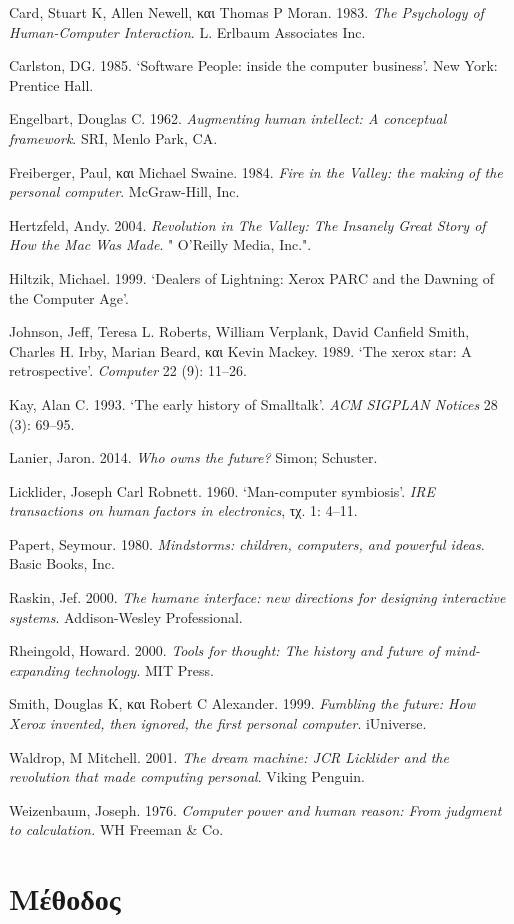 \documentclass[
]{article}
\begin{document}
Card, Stuart K, Allen Newell, και Thomas P Moran. 1983. \emph{The
Psychology of Human-Computer Interaction}. L. Erlbaum Associates Inc.

Carlston, DG. 1985. {`Software People: inside the computer business'}.
New York: Prentice Hall.

Engelbart, Douglas C. 1962. \emph{Augmenting human intellect: A
conceptual framework}. SRI, Menlo Park, CA.

Freiberger, Paul, και Michael Swaine. 1984. \emph{Fire in the Valley:
the making of the personal computer}. McGraw-Hill, Inc.

Hertzfeld, Andy. 2004. \emph{Revolution in The Valley: The Insanely
Great Story of How the Mac Was Made}. " O'Reilly Media, Inc.".

Hiltzik, Michael. 1999. {`Dealers of Lightning: Xerox PARC and the
Dawning of the Computer Age'}.

Johnson, Jeff, Teresa L. Roberts, William Verplank, David Canfield
Smith, Charles H. Irby, Marian Beard, και Kevin Mackey. 1989. {`The
xerox star: A retrospective'}. \emph{Computer} 22 (9): 11--26.

Kay, Alan C. 1993. {`The early history of Smalltalk'}. \emph{ACM SIGPLAN
Notices} 28 (3): 69--95.

Lanier, Jaron. 2014. \emph{Who owns the future?} Simon; Schuster.

Licklider, Joseph Carl Robnett. 1960. {`Man-computer symbiosis'}.
\emph{IRE transactions on human factors in electronics}, τχ. 1: 4--11.

Papert, Seymour. 1980. \emph{Mindstorms: children, computers, and
powerful ideas}. Basic Books, Inc.

Raskin, Jef. 2000. \emph{The humane interface: new directions for
designing interactive systems}. Addison-Wesley Professional.

Rheingold, Howard. 2000. \emph{Tools for thought: The history and future
of mind-expanding technology}. MIT Press.

Smith, Douglas K, και Robert C Alexander. 1999. \emph{Fumbling the
future: How Xerox invented, then ignored, the first personal computer}.
iUniverse.

Waldrop, M Mitchell. 2001. \emph{The dream machine: JCR Licklider and
the revolution that made computing personal}. Viking Penguin.

Weizenbaum, Joseph. 1976. \emph{Computer power and human reason: From
judgment to calculation.} WH Freeman \& Co.

\hypertarget{ux3bcux3adux3b8ux3bfux3b4ux3bfux3c2}{%
\section{Μέθοδος}\label{ux3bcux3adux3b8ux3bfux3b4ux3bfux3c2}}
\end{document}
